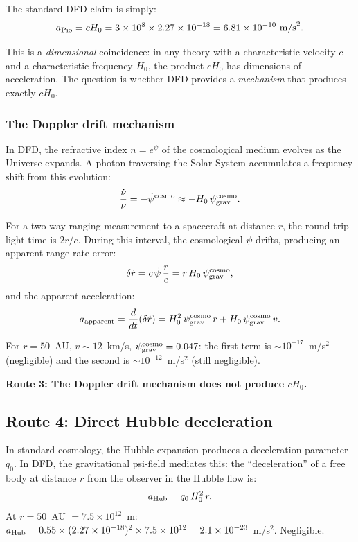 \documentclass[11pt]{article}
\newcommand{\ee}[1]{\times 10^{#1}}
\newcommand{\psigrav}{\psi_{\rm grav}}
\newcommand{\Hzero}{H_0}
\begin{document}
The standard DFD claim is simply:
\begin{equation}
a_{\rm Pio} = c\Hzero = 3\ee{8} \times 2.27\ee{-18}
= 6.81\ee{-10}~\text{m/s}^2.
\label{eq:cH0}
\end{equation}

This is a \emph{dimensional} coincidence: in any theory with a
characteristic velocity $c$ and a characteristic frequency $\Hzero$,
the product $c\Hzero$ has dimensions of acceleration. The question
is whether DFD provides a \emph{mechanism} that produces exactly $c\Hzero$.

\subsubsection{The Doppler drift mechanism}

In DFD, the refractive index $n = e^\psi$ of the cosmological medium
evolves as the Universe expands. A photon traversing the Solar System
accumulates a frequency shift from this evolution:
\begin{equation}
\frac{\dot{\nu}}{\nu} = -\dot{\psi}^{\rm cosmo}
\approx -\Hzero\,\psigrav^{\rm cosmo}.
\end{equation}

For a two-way ranging measurement to a spacecraft at distance $r$, the
round-trip light-time is $2r/c$. During this interval, the cosmological
$\psi$ drifts, producing an apparent range-rate error:
\begin{equation}
\delta\dot{r} = c\,\dot{\psi}\,\frac{r}{c}
= r\,\Hzero\,\psigrav^{\rm cosmo},
\end{equation}
and the apparent acceleration:
\begin{equation}
a_{\rm apparent} = \frac{d}{dt}(\delta\dot{r})
= \Hzero^2\,\psigrav^{\rm cosmo}\,r + \Hzero\,\psigrav^{\rm cosmo}\,v.
\end{equation}

For $r = 50$~AU, $v \sim 12$~km/s, $\psigrav^{\rm cosmo} = 0.047$:
the first term is $\sim 10^{-17}$~m/s$^2$ (negligible) and the second
is $\sim 10^{-12}$~m/s$^2$ (still negligible).

\textbf{Route 3: The Doppler drift mechanism does not produce $c\Hzero$.}

\subsection{Route 4: Direct Hubble deceleration}

In standard cosmology, the Hubble expansion produces a deceleration
parameter $q_0$. In DFD, the gravitational psi-field mediates this:
the ``deceleration'' of a free body at distance $r$ from the observer
in the Hubble flow is:
\begin{equation}
a_{\rm Hub} = q_0\,\Hzero^2\,r.
\end{equation}
At $r = 50$~AU $= 7.5\ee{12}$~m: $a_{\rm Hub} = 0.55 \times
(2.27\ee{-18})^2 \times 7.5\ee{12} = 2.1\ee{-23}$~m/s$^2$.
Negligible.
\end{document}
